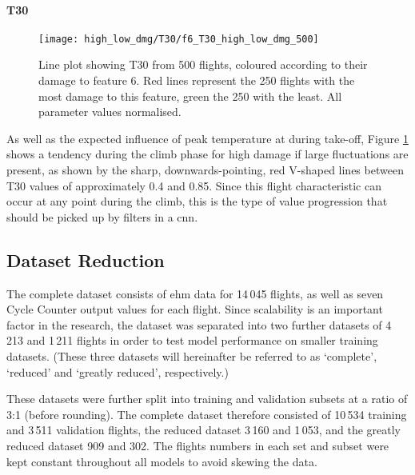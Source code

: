 \paragraph{T30}
\begin{figure}
    \centering
    \texttt{[image: high\_low\_dmg/T30/f6\_T30\_high\_low\_dmg\_500]}
    \caption{\label{fig:high_low_dmg_T30} Line plot showing T30 from 500 flights, coloured according to their damage to feature 6. Red lines represent the 250 flights with the most damage to this feature, green the 250 with the least. All parameter values normalised.}
\end{figure}

As well as the expected influence of peak temperature at during take-off, Figure \ref{fig:high_low_dmg_T30} shows a tendency during the climb phase for high damage if large fluctuations are present, as shown by the sharp, downwards-pointing, red V-shaped lines between T30 values of approximately 0.4 and 0.85. Since this flight characteristic can occur at any point during the climb, this is the type of value progression that should be picked up by filters in a \ac{cnn}.

\subsection{Dataset Reduction} \label{sec:data_sizes}
The complete dataset consists of \ac{ehm} data for 14\,045 flights, as well as seven Cycle Counter output values for each flight. Since scalability is an important factor in the research, the dataset was separated into two further datasets of 4\,213 and 1\,211 flights in order to test model performance on smaller training datasets. (These three datasets will hereinafter be referred to as `complete', `reduced' and `greatly reduced', respectively.)

These datasets were further split into training and validation subsets at a ratio of 3:1 (before rounding). The complete dataset therefore consisted of 10\,534 training and 3\,511 validation flights, the reduced dataset 3\,160 and 1\,053, and the greatly reduced dataset 909 and 302. The flights numbers in each set and subset were kept constant throughout all models to avoid skewing the data.



